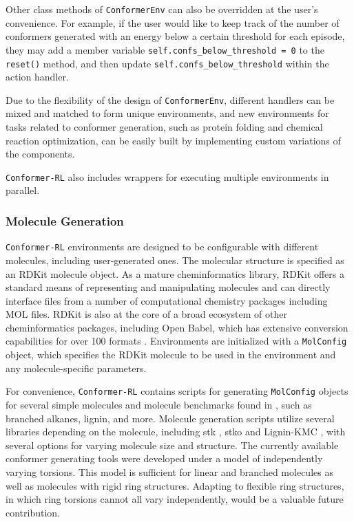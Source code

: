 \documentclass[twoside,11pt]{article}
\newcommand{\code}[1]{\texttt{#1}}
\newcommand{\titleofpaper}{Conformer-RL}
\begin{document}
Other class methods of \code{ConformerEnv} can also be overridden at the user's convenience. For example, if the user would like to keep track of the number of conformers generated with an energy below a certain threshold for each episode, they may add a member variable \code{self.confs\_below\_threshold = 0} to the \code{reset()} method, and then update \code{self.confs\_below\_threshold} within the action handler.

Due to the flexibility of the design of \code{ConformerEnv}, different handlers can be mixed and matched to form unique environments, and new environments for tasks related to conformer generation, such as protein folding and chemical reaction optimization, can be easily built by implementing custom variations of the components.

\code{\titleofpaper} also includes wrappers for executing multiple environments in parallel. 

  \subsubsection{Molecule Generation}
  \code{\titleofpaper} environments are designed to be configurable with different molecules, including user-generated ones. The molecular structure is specified as an RDKit molecule object. As a mature cheminformatics library, RDKit offers a standard means of representing and manipulating molecules and can directly interface files from a number of computational chemistry packages including MOL files. RDKit is also at the core of a broad ecosystem of other cheminformatics packages, including Open Babel, which has extensive conversion capabilities for over 100 formats \citep{Oboyle2011openbabel}. Environments are initialized with a \code{MolConfig} object, which specifies the RDKit molecule to be used in the environment and any molecule-specific parameters.

  For convenience, \code{\titleofpaper} contains scripts for generating \code{MolConfig} objects for several simple molecules and molecule benchmarks found in \citet{gogineni2020torsionnet}, such as branched alkanes, lignin, and more. Molecule generation scripts utilize several libraries depending on the molecule, including stk \citep{Turcani2021stk}, stko \citep{Tarzia2021stko} and Lignin-KMC \citep{Orella2019ligninkmc}, with several options for varying molecule size and structure. The currently available conformer generating tools were developed under a model of independently varying torsions. This model is sufficient for linear and branched molecules as well as molecules with rigid ring structures. Adapting to flexible ring structures, in which ring torsions cannot all vary independently, would be a valuable future contribution.
  
\end{document}
